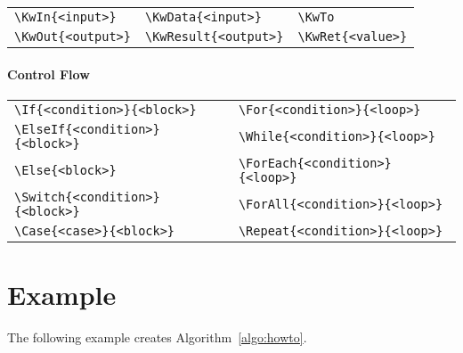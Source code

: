\begin{tabular}{lll}
    \verb|\KwIn{<input>}| & \verb|\KwData{<input>}| & \verb|\KwTo| \\
    \verb|\KwOut{<output>}| & \verb|\KwResult{<output>}| & \verb|\KwRet{<value>}|
\end{tabular}

\paragraph{Control Flow}

\begin{tabular}{ll}
    \verb|\If{<condition>}{<block>}| & \verb|\For{<condition>}{<loop>}| \\
    \verb|\ElseIf{<condition>}{<block>}| & \verb|\While{<condition>}{<loop>}| \\
    \verb|\Else{<block>}| & \verb|\ForEach{<condition>}{<loop>}| \\
    \verb|\Switch{<condition>}{<block>}| & \verb|\ForAll{<condition>}{<loop>}| \\
    \verb|\Case{<case>}{<block>}| & \verb|\Repeat{<condition>}{<loop>}|
\end{tabular}

\section*{Example}

The following example creates Algorithm~\ref{algo:howto}.

\bigskip



\bigskip


